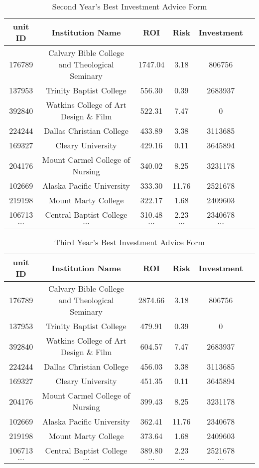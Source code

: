 \documentclass{mcmthesis}
\begin{document}
\begin{table}[h]
\centering
\caption{Second Year's Best Investment Advice Form}
\label{tab:Second Year's Best Investment Advice Form}
\begin{tabular}{cccccc}
\toprule
unit ID &	 Institution Name &	ROI & Risk	& Investment\\
\midrule
176789&	Calvary Bible College and Theological Seminary&	1747.04	&3.18	&806756\\
137953&	Trinity Baptist College	&556.30	&0.39	&2683937\\
392840&	Watkins College of Art Design \& Film&	522.31&	7.47&	0\\
224244&	Dallas Christian College &	433.89	&3.38&	3113685\\
169327&	Cleary University	&429.16	&0.11	&3645894\\
204176&	Mount Carmel College of Nursing	&340.02&	8.25&	3231178\\
102669&	Alaska Pacific University&	333.30&	11.76&	2521678\\
219198&	Mount Marty College	&322.17&	1.68	&2409603\\
106713&	Central Baptist College&	310.48&	2.23&	2340678\\

$\cdots$&$\cdots$&$\cdots$&$\cdots$&$\cdots$\\
\bottomrule
\end{tabular}
\end{table}


\begin{table}[h]
\centering
\caption{Third Year's Best Investment Advice Form}
\label{tab:Third Year's Best Investment Advice Form}
\begin{tabular}{cccccc}
\toprule
unit ID &	 Institution Name &	ROI & Risk	& Investment\\
\midrule
176789&	Calvary Bible College and Theological Seminary&	2874.66&	3.18&	806756\\
137953&	Trinity Baptist College&	479.91&	0.39&	0\\
392840&	Watkins College of Art Design \& Film&	604.57&	7.47&	2683937\\
224244&	Dallas Christian College&	456.03&	3.38&	3113685\\
169327&	Cleary University&	451.35&	0.11&	3645894\\
204176&	Mount Carmel College of Nursing & 	399.43 &	8.25&	3231178\\
102669&	Alaska Pacific University&	362.41&	11.76&	2340678\\
219198&	Mount Marty College&	373.64&	1.68&	2409603\\
106713&	Central Baptist College&	389.80&	2.23&	2521678\\
$\cdots$&$\cdots$&$\cdots$&$\cdots$&$\cdots$\\
\bottomrule
\end{tabular}
\end{table}
\end{document}

